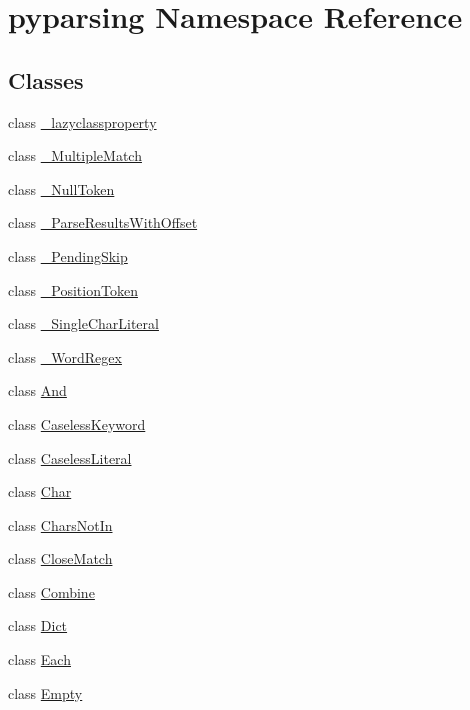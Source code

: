 \hypertarget{namespacepyparsing}{}\section{pyparsing Namespace Reference}
\label{namespacepyparsing}
\subsection*{Classes}
\begin{DoxyCompactItemize}
\item 
class \hyperlink{classpyparsing_1_1__lazyclassproperty}{\+\_\+lazyclassproperty}
\item 
class \hyperlink{classpyparsing_1_1__MultipleMatch}{\+\_\+\+Multiple\+Match}
\item 
class \hyperlink{classpyparsing_1_1__NullToken}{\+\_\+\+Null\+Token}
\item 
class \hyperlink{classpyparsing_1_1__ParseResultsWithOffset}{\+\_\+\+Parse\+Results\+With\+Offset}
\item 
class \hyperlink{classpyparsing_1_1__PendingSkip}{\+\_\+\+Pending\+Skip}
\item 
class \hyperlink{classpyparsing_1_1__PositionToken}{\+\_\+\+Position\+Token}
\item 
class \hyperlink{classpyparsing_1_1__SingleCharLiteral}{\+\_\+\+Single\+Char\+Literal}
\item 
class \hyperlink{classpyparsing_1_1__WordRegex}{\+\_\+\+Word\+Regex}
\item 
class \hyperlink{classpyparsing_1_1And}{And}
\item 
class \hyperlink{classpyparsing_1_1CaselessKeyword}{Caseless\+Keyword}
\item 
class \hyperlink{classpyparsing_1_1CaselessLiteral}{Caseless\+Literal}
\item 
class \hyperlink{classpyparsing_1_1Char}{Char}
\item 
class \hyperlink{classpyparsing_1_1CharsNotIn}{Chars\+Not\+In}
\item 
class \hyperlink{classpyparsing_1_1CloseMatch}{Close\+Match}
\item 
class \hyperlink{classpyparsing_1_1Combine}{Combine}
\item 
class \hyperlink{classpyparsing_1_1Dict}{Dict}
\item 
class \hyperlink{classpyparsing_1_1Each}{Each}
\item 
class \hyperlink{classpyparsing_1_1Empty}{Empty}
\item 

\end{DoxyCompactItemize}
